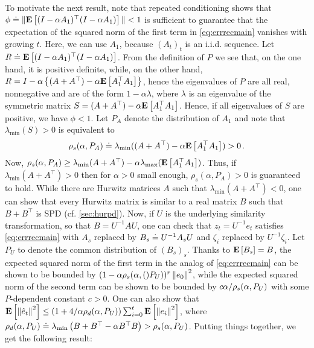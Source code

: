 \iffalse
From \eqref{eq:errrecmain}, it is clear that the magnitude of $\hat e_t$ is governed by the behavior
of the products $\Pi_{s=i+1}^{t}(I-\alpha A_s)$, $j=0,\dots,t$. 
Here, we will perform some crude upper bounding and derive simple sufficient conditions that guarantee that on expectation these product matrices are ``small''. However, we will show that the error bounds derived are tight in a worst-case sense.
\fi

To motivate the next result, note that repeated conditioning shows that
$\phi \doteq \|  \mathbf{E}\left[ (I-\alpha A_1)^\top (I-\alpha A_1)\right] \|<1$ is sufficient 
 to guarantee that the expectation of the squared norm of the
 first term in \eqref{eq:errrecmain} vanishes with growing $t$.
Here, we can use $A_1$, because $(A_t)_t$ is an i.i.d. sequence.
Let $R \doteq \mathbf{E}\left[ (I-\alpha A_1)^\top (I-\alpha A_1)\right]$.
From the definition of $P$ we see that, on the one hand, it is positive
definite, while, on the other hand,
$R= I - \alpha \left\{(A+A^\top) -\alpha \mathbf{E}\left[A_1^\top A_1\right]\right\}$,
hence the eigenvalues of $P$ are all real, nonnegative
and are of the form $1-\alpha \lambda$,
where $\lambda$ is an eigenvalue of the symmetric matrix 
$S = (A+A^\top) -\alpha \mathbf{E}\left[A_1^\top A_1\right]$.
Hence, if all eigenvalues of $S$ are positive, we have
$\phi<1$. 
Let $P_A$ denote the distribution of $A_1$ and note that $\lambda_{\min}(S)>0$ is equivalent to
\begin{align*}
\rho_s(\alpha,P_A) \doteq \lambda_{\min} ((A+A^\top) -\alpha \mathbf{E}\left[A_1^\top A_1\right] )>0\,.
\end{align*}
Now,
$\rho_s(\alpha,P_A) \ge \lambda_{\min}( A+A^\top ) - \alpha \lambda_{\max} (\mathbf{E}\left[ A_1^\top A_1\right])$. Thus, if $\lambda_{\min}(A+A^\top)>0$ then for $\alpha>0$ small enough, $\rho_s(\alpha,P_A)>0$ is guaranteed to hold. While there are Hurwitz matrices $A$ such that $\lambda_{\min}(A+A^\top)<0$, one can show that every Hurwitz matrix is similar to a real matrix $B$ such that $B+B^\top$ is SPD (cf. \cref{sec:hurpd}). Now, if $U$ is the underlying similarity transformation, so that $B=U^{-1} A U$, one can check that $z_t = U^{-1} e_t$ satisfies \eqref{eq:errrecmain} with $A_s$ replaced by $B_s \doteq U^{-1} A_s U$ and $\zeta_i$ replaced by $U^{-1} \zeta_i$. Let $P_U$ to denote the common distribution of $(B_s)_s$.
Thanks to $\mathbf{E}\left[B_s\right] = B$, the expected squared norm of the first term in the analog of  \eqref{eq:errrecmain} can be shown to be bounded by $(1-\alpha \rho_s(\alpha,()P_U))^r \left\| e_0\right\|^2$, 
while the expected squared norm of the second term can be shown to be bounded by $c \alpha /\rho_s(\alpha,P_U)$ with some $P$-dependent constant $c>0$. One can also show that $\mathbf{E}\left[\left\| \hat e_t\right\|^2\right]\le (1+4/\alpha \rho_d(\alpha,P_U)) \sum_{i=0}^t \mathbf{E}\left[ \left\| e_i\right\|^2 \right]$, where $\rho_d(\alpha,P_U) \doteq \lambda_{\min}\left(B+B^\top - \alpha B^\top B\right)>\rho_s(\alpha,P_U)$. Putting things together, we get the following result:
